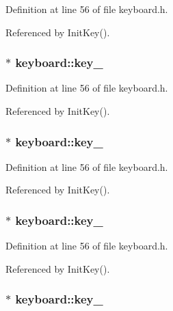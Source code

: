 Definition at line 56 of file keyboard.h.

Referenced by Init\-Key().
\subsubsection{ $\ast$ {\bf keyboard::key\_}\hspace{0.3cm}{\tt  [private]}}\label{classkeyboard_keyboardr27}




Definition at line 56 of file keyboard.h.

Referenced by Init\-Key().
\subsubsection{ $\ast$ {\bf keyboard::key\_}\hspace{0.3cm}{\tt  [private]}}\label{classkeyboard_keyboardr28}




Definition at line 56 of file keyboard.h.

Referenced by Init\-Key().
\subsubsection{ $\ast$ {\bf keyboard::key\_}\hspace{0.3cm}{\tt  [private]}}\label{classkeyboard_keyboardr29}




Definition at line 56 of file keyboard.h.

Referenced by Init\-Key().
\subsubsection{ $\ast$ {\bf keyboard::key\_}\hspace{0.3cm}{\tt  [private]}}\label{classkeyboard_keyboardr30}




